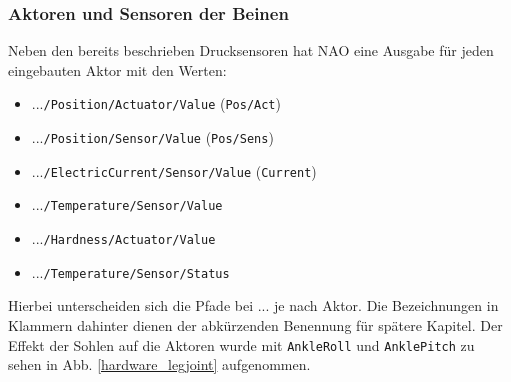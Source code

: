 \subsubsection*{Aktoren und Sensoren der Beinen}
Neben den bereits beschrieben Drucksensoren hat NAO eine Ausgabe für jeden eingebauten Aktor mit den Werten:
\begin{itemize}
	\item ...\texttt{/Position/Actuator/Value} (\texttt{Pos/Act})
	\item ...\texttt{/Position/Sensor/Value} (\texttt{Pos/Sens})
	\item ...\texttt{/ElectricCurrent/Sensor/Value} (\texttt{Current})
	\item ...\texttt{/Temperature/Sensor/Value}
	\item ...\texttt{/Hardness/Actuator/Value} 
	\item ...\texttt{/Temperature/Sensor/Status} 
\end{itemize}
Hierbei unterscheiden sich die Pfade bei \glqq ...\grqq{} je nach Aktor. Die Bezeichnungen in Klammern dahinter dienen der abkürzenden Benennung für spätere Kapitel. Der Effekt der Sohlen auf die Aktoren wurde mit \texttt{AnkleRoll} und \texttt{AnklePitch} zu sehen in Abb. \ref{hardware_legjoint} aufgenommen.


